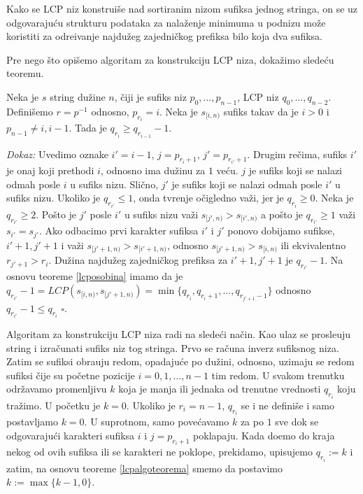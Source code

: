 Kako se LCP niz konstrui\v se nad sortiranim nizom sufiksa jednog stringa, on se uz odgovaraju\' cu strukturu podataka za nala\v zenje minimuma u podnizu mo\v ze koristiti za odre\dj ivanje najdu\v zeg zajedni\v ckog prefiksa bilo koja dva sufiksa.

Pre nego \v sto opi\v semo algoritam za konstrukciju LCP niza, doka\v zimo slede\' cu teoremu.

\begin{thm}
\label{lcpalgoteorema}
Neka je $s$ string du\v zine $n$, \v ciji je sufiks niz $p_0, \ldots, p_{n-1}$, LCP niz $q_0, \ldots, q_{n-2}$. Defini\v semo $r = p^{-1}$ odnosno, $p_{r_i} = i$. Neka je $s_{[i, n)}$ sufiks takav da je $i>0$ i $p_{n-1} \not = i, i-1$. Tada je $q_{r_i} \geq q_{r_{i-1}} - 1$.
\end{thm}

\textit{Dokaz:} Uvedimo oznake $i' = i-1$, $j = p_{r_i + 1}$, $j' = p_{r_{i'} + 1}$. Drugim re\v cima, sufiks $i'$ je onaj koji prethodi $i$, odnosno ima du\v zinu za $1$ ve\' cu. $j$ je sufiks koji se nalazi odmah posle $i$ u sufiks nizu. Sli\v cno, $j'$ je sufiks koji se nalazi odmah posle $i'$ u sufiks nizu.  Ukoliko je $q_{r_{i'}} \leq 1$, onda tvr\dj enje o\v cigledno va\v zi, jer je $q_{r_i} \geq 0$. Neka je $q_{r_{i'}} \geq 2$. Po\v sto je $j'$ posle $i'$ u sufiks nizu va\v zi $s_{[j', n)} > s_{[i', n)}$ a po\v sto je $q_{r_{i'}} \geq 1$ va\v zi $s_{i'} = s_{j'}$. Ako odbacimo prvi karakter sufiksa $i'$ i $j'$ ponovo dobijamo sufikse, $i'+1, j'+1$ i va\v zi $s_{[j'+1, n)} > s_{[i'+1, n)}$, odnosno $s_{[j'+1, n)} > s_{[i, n)}$ ili ekvivalentno $r_{j'+1} > r_i$. Du\v zina najdu\v zeg zajedni\v ckog prefiksa za $i'+1, j'+1$ je $q_{r_{i'}} - 1$. Na osnovu teoreme \ref{lcposobina} imamo da je $q_{r_{i'}} - 1 = LCP(s_{[i, n)}, s_{[j'+1, n)}) = \min\{ q_{r_i}, q_{r_i+1}, \ldots, q_{r_{j'+1}-1} \}$ odnosno $q_{r_{i'}} - 1 \leq q_{r_i}$ \hfill $\square$.

Algoritam za konstrukciju LCP niza\cite{lcpnizrad} radi na slede\' ci na\v cin. Kao ulaz se prosle\dj uju string i izra\v cunati sufiks niz tog stringa. Prvo se ra\v cuna inverz sufiksnog niza. Zatim se sufiksi obra\dj uju redom, opadaju\' ce po du\v zini, odnosno, uzimaju se redom sufiksi \v cije su po\v cetne pozicije $i = 0, 1, \ldots, n-1$ tim redom. U svakom trenutku odr\v zavamo promenljivu $k$ koja je manja ili jednaka od trenutne vrednosti $q_{r_i}$ koju tra\v zimo. U po\v cetku je $k=0$. Ukoliko je $r_i = n-1$, $q_{r_i}$ se i ne defini\v se i samo postavljamo $k=0$. U suprotnom, samo pove\' cavamo $k$ za po $1$ sve dok se odgovaraju\' ci karakteri sufiksa $i$ i $j = p_{r_i + 1}$ poklapaju. Kada do\dj emo do kraja nekog od ovih sufiksa ili se karakteri ne poklope, prekidamo, upisujemo $q_{r_i} := k$ i zatim, na osnovu teoreme \ref{lcpalgoteorema} smemo da postavimo $k := \max\{k-1, 0\}$.

